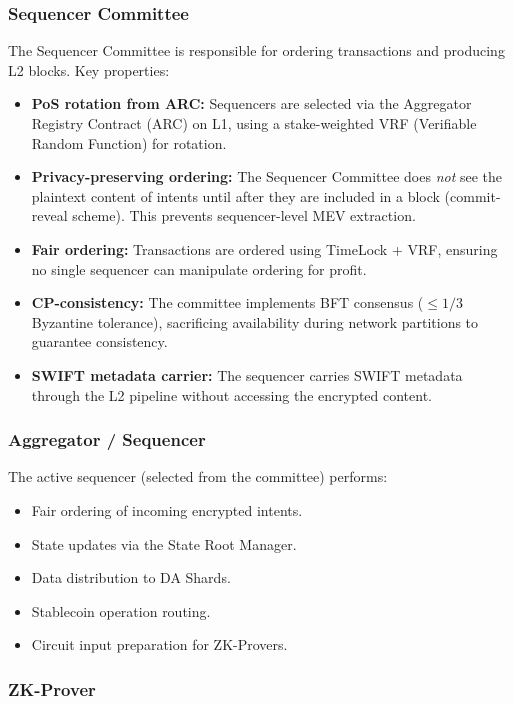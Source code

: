 \documentclass[12pt,a4paper]{article}
\theoremstyle{definition}
\theoremstyle{remark}
\begin{document}
\subsubsection{Sequencer Committee}
\label{sec:sequencer-committee}

The Sequencer Committee is responsible for ordering transactions and producing L2 blocks. Key properties:

\begin{itemize}[nosep]
    \item \textbf{PoS rotation from ARC:} Sequencers are selected via the Aggregator Registry Contract (ARC) on L1, using a stake-weighted VRF (Verifiable Random Function) for rotation.
    \item \textbf{Privacy-preserving ordering:} The Sequencer Committee does \emph{not} see the plaintext content of intents until after they are included in a block (commit-reveal scheme). This prevents sequencer-level MEV extraction.
    \item \textbf{Fair ordering:} Transactions are ordered using TimeLock + VRF, ensuring no single sequencer can manipulate ordering for profit.
    \item \textbf{CP-consistency:} The committee implements BFT consensus ($\leq 1/3$ Byzantine tolerance), sacrificing availability during network partitions to guarantee consistency.
    \item \textbf{SWIFT metadata carrier:} The sequencer carries SWIFT metadata through the L2 pipeline without accessing the encrypted content.
\end{itemize}

\subsubsection{Aggregator / Sequencer}

The active sequencer (selected from the committee) performs:
\begin{itemize}[nosep]
    \item Fair ordering of incoming encrypted intents.
    \item State updates via the State Root Manager.
    \item Data distribution to DA Shards.
    \item Stablecoin operation routing.
    \item Circuit input preparation for ZK-Provers.
\end{itemize}

\subsubsection{ZK-Prover}
\end{document}

